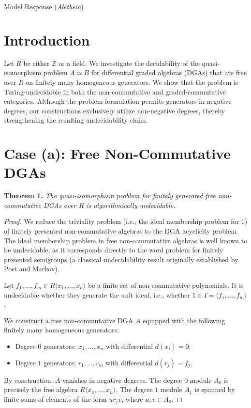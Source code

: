 \documentclass{article}
\theoremstyle{plain}
\theoremstyle{definition}
\newcommand{\Aletheia}{\emph{Aletheia}}
\begin{document}
\begin{solution}{Model Response (\Aletheia)}
    \section*{Introduction}
Let $R$ be either $\mathbb{Z}$ or a field. We investigate the decidability of the quasi-isomorphism problem $A \simeq B$ for differential graded algebras (DGAs) that are free over $R$ on finitely many homogeneous generators. We show that the problem is Turing-undecidable in both the non-commutative and graded-commutative categories. Although the problem formulation permits generators in negative degrees, our constructions exclusively utilize non-negative degrees, thereby strengthening the resulting undecidability claim.

\section*{Case (a): Free Non-Commutative DGAs}

\textbf{Theorem 1.} \textit{The quasi-isomorphism problem for finitely generated free non-commutative DGAs over $R$ is algorithmically undecidable.}

\begin{proof}
We reduce the triviality problem (i.e., the ideal membership problem for $1$) of finitely presented non-commutative algebras to the DGA acyclicity problem. The ideal membership problem in free non-commutative algebras is well known to be undecidable, as it corresponds directly to the word problem for finitely presented semigroups (a classical undecidability result originally established by Post and Markov).

Let $f_1, \dots, f_m \in R\langle x_1, \dots, x_n \rangle$ be a finite set of non-commutative polynomials. It is undecidable whether they generate the unit ideal, i.e., whether $1 \in I = \langle f_1, \dots, f_m \rangle$.

We construct a free non-commutative DGA $A$ equipped with the following finitely many homogeneous generators:
\begin{itemize}
    \item Degree $0$ generators: $x_1, \dots, x_n$ with differential $d(x_i) = 0$.
    \item Degree $1$ generators: $r_1, \dots, r_m$ with differential $d(r_j) = f_j$.
\end{itemize}
By construction, $A$ vanishes in negative degrees. The degree $0$ module $A_0$ is precisely the free algebra $R\langle x_1, \dots, x_n \rangle$. The degree $1$ module $A_1$ is spanned by finite sums of elements of the form $u r_j v$, where $u, v \in A_0$.


\end{proof}
\end{solution}
\end{document}
